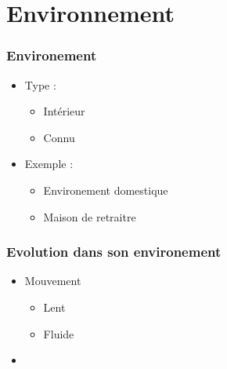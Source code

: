 \section{Environnement}

\begin{frame}
	\frametitle{Environement}
	\begin{itemize}
	\item Type :
		\begin{itemize}
		\item Intérieur
		\item Connu
		\end{itemize}
	\item Exemple :
		\begin{itemize}
		\item Environement domestique
		\item Maison de retraitre 
		\end{itemize}
	\end{itemize}
\end{frame}

\begin{frame}
	\frametitle{Evolution dans son environement}
	\begin{itemize}
	\item Mouvement
		\begin{itemize}
		\item Lent
		\item Fluide
		\end{itemize}
	\item
	\end{itemize}
\end{frame}
